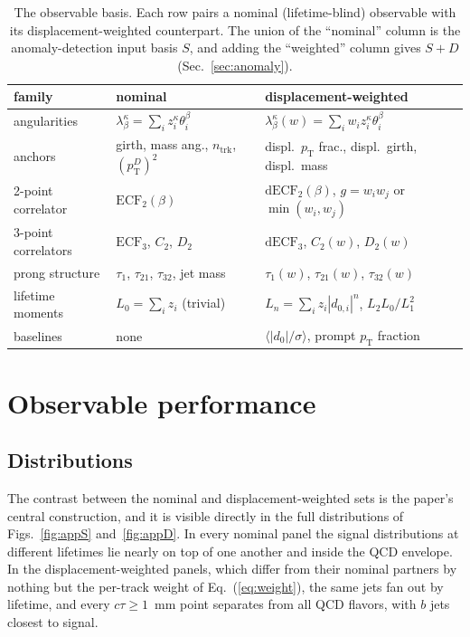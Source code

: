 \documentclass[a4paper,11pt]{article}
\newcommand{\dnought}{d_0}
\newcommand{\ctau}{c\tau}
\newcommand{\pT}{p_{\mathrm{T}}}
\begin{document}
\begin{table}[tb]
  \centering
  \caption{The observable basis. Each row pairs a nominal
  (lifetime-blind) observable with its displacement-weighted
  counterpart. The union of the ``nominal'' column is the
  anomaly-detection input basis $S$, and adding the ``weighted'' column
  gives $S{+}D$ (Sec.~\ref{sec:anomaly}).}
  \label{tab:observables}
  \small
  \begin{tabular}{@{}l p{} p{}@{}}
    \hline
    family & nominal & displacement-weighted \\
    \hline
    angularities
      & $\lambda^\kappa_\beta = \sum_i z_i^\kappa \theta_i^\beta$
      & $\lambda^\kappa_\beta(w) = \sum_i w_i z_i^\kappa \theta_i^\beta$ \\
    \quad anchors
      & girth, mass ang., $n_{\mathrm{trk}}$, $(\pT^D)^2$
      & displ.\ $\pT$ frac., displ.\ girth, displ.\ mass \\
    2-point correlator
      & $\mathrm{ECF}_2(\beta)$
      & $\mathrm{dECF}_2(\beta)$, $g = w_i w_j$ or $\min(w_i, w_j)$ \\
    3-point correlators
      & $\mathrm{ECF}_3$, $C_2$, $D_2$
      & $\mathrm{dECF}_3$, $C_2(w)$, $D_2(w)$ \\
    prong structure
      & $\tau_1$, $\tau_{21}$, $\tau_{32}$, jet mass
      & $\tau_1(w)$, $\tau_{21}(w)$, $\tau_{32}(w)$ \\
    lifetime moments
      & $L_0 = \sum_i z_i$ (trivial)
      & $L_n = \sum_i z_i |d_{0,i}|^n$, $L_2 L_0/L_1^2$ \\
    baselines
      & none
      & $\langle |\dnought|/\sigma \rangle$, prompt $\pT$ fraction \\
    \hline
  \end{tabular}
\end{table}

\section{Observable performance}
\label{sec:results}

\subsection{Distributions}

The contrast between the nominal and displacement-weighted sets is the
paper's central construction, and it is visible directly in the full
distributions of Figs.~\ref{fig:appS} and~\ref{fig:appD}. In every
nominal panel the signal distributions at different lifetimes lie
nearly on top of one another and inside the QCD envelope. In the
displacement-weighted panels, which differ from their nominal partners
by nothing but the per-track weight of Eq.~(\ref{eq:weight}), the same
jets fan out by lifetime, and every $\ctau \geq 1$~mm point separates
from all QCD flavors, with $b$ jets closest to signal.
\end{document}
